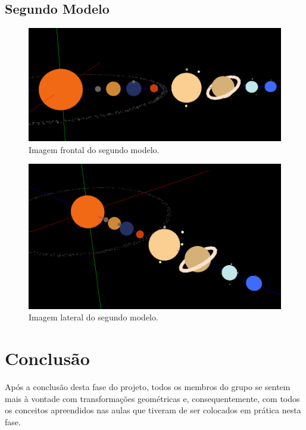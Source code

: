 \documentclass[a4paper]{article}
\begin{document}
\newpage

\subsection{Segundo Modelo}

\begin{figure}[H]
\centering
\includegraphics[scale=0.4]{modelo2_1.png}
\caption{Imagem frontal do segundo modelo.}
\label{img:modelo2_1}
\end{figure}

\begin{figure}[H]
\centering
\includegraphics[scale=0.4]{modelo2_2.png}
\caption{Imagem lateral do segundo modelo.}
\label{img:modelo2_2}
\end{figure}


\newpage

\section{Conclusão}
\label{sec:conclusao}

Após a conclusão desta fase do projeto, todos os membros do grupo se sentem mais à vontade com transformações geométricas e, consequentemente, com todos os conceitos apreendidos nas aulas que tiveram de ser colocados em prática nesta fase.
\end{document}
